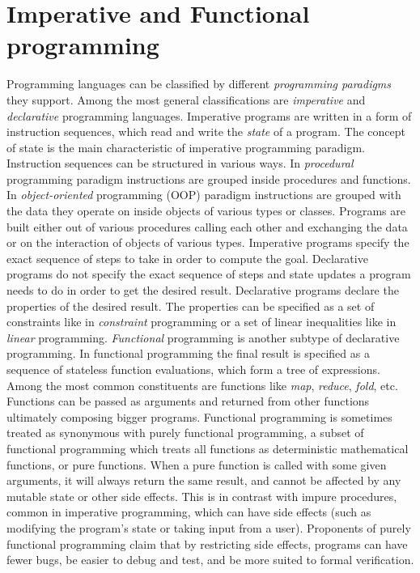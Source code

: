\section{Imperative and Functional programming}
\label{background_programming_paradigms}
\quad Programming languages can be classified by different \textit{programming paradigms} they support. Among the most general classifications are \textit{imperative} and \textit{declarative} programming languages.\newline\null
\quad Imperative programs are written in a form of instruction sequences, which read and write the \textit{state} of a program. The concept of state is the main characteristic of imperative programming paradigm. Instruction sequences can be structured in various ways. In \textit{procedural} programming paradigm instructions are grouped inside procedures and functions. In \textit{object-oriented} programming (OOP) paradigm instructions are grouped with the data they operate on inside objects of various types or classes. Programs are built either out of various procedures calling each other and exchanging the data or on the interaction of objects of various types. Imperative programs specify the exact sequence of steps to take in order to compute the goal.\newline\null
\quad Declarative programs do not specify the exact sequence of steps and state updates a program needs to do in order to get the desired result. Declarative programs declare the properties of the desired result. The properties can be specified as a set of constraints like in \textit{constraint} programming or a set of linear inequalities like in \textit{linear} programming. \textit{Functional} programming is another subtype of declarative programming. In functional programming the final result is specified as a sequence of stateless function evaluations, which form a tree of expressions. Among the most common constituents are functions like \textit{map}, \textit{reduce}, \textit{fold}, etc. Functions can be passed as arguments and returned from other functions ultimately composing bigger programs.\newline\null
\quad Functional programming is sometimes treated as synonymous with purely functional programming, a subset of functional programming which treats all functions as deterministic mathematical functions, or pure functions. When a pure function is called with some given arguments, it will always return the same result, and cannot be affected by any mutable state or other side effects. This is in contrast with impure procedures, common in imperative programming, which can have side effects (such as modifying the program's state or taking input from a user). Proponents of purely functional programming claim that by restricting side effects, programs can have fewer bugs, be easier to debug and test, and be more suited to formal verification.\newline\null
